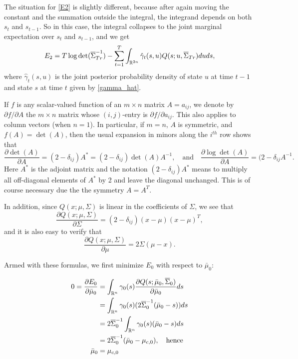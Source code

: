 \documentclass[12pt,leqno]{article}
\begin{document}
The situation for \eqref{E2} is slightly different, because after again moving the constant and the summation outside
the integral, the integrand depends on both $s_t$ and $s_{t-1}$.  So in this case, the integral collapses to the 
joint marginal expectation over $s_t$ and $s_{t-1}$, and we get
$$
E_2 = T\log\det(\overline{\Sigma}^{-1}_{Tr}) - \sum_{t=1}^T\int_{{\mathbb R}^{2n}}\hat{\gamma}_t(s,u)Q(s;u,\overline{\Sigma}_{Tr})duds,
$$
where $\hat{\gamma}_t(s,u)$ is the joint posterior probability density of state $u$ at time $t-1$ and state $s$ 
at time $t$ given by \eqref{gamma_hat}.

If $f$ is any scalar-valued function of an $m\times{n}$ matrix $A = a_{ij}$, we denote by $\partial{f}/\partial{A}$ the 
$m\times{n}$ matrix whose $(i,j)$-entry is $\partial{f}/\partial{a_{ij}}$.  This also applies to column vectors (when $n=1$).
In particular, if $m=n$, $A$ is symmetric, and $f(A) = \det(A)$,  then the usual expansion 
in minors along the $i^{th}$ row shows that 
$$
\frac{\partial{\det(A)}}{\partial{A}} = (2-\delta_{ij})A^* = (2-\delta_{ij})\det(A)A^{-1},\quad\text{and}
\quad\frac{\partial{\log\det(A)}}{\partial{A}} = (2-\delta_{ij}A^{-1}. 
$$
Here $A^*$ is the adjoint matrix and the notation $(2-\delta_{ij})A^*$ means to multiply all off-diagonal elements of $A^*$ by 2
and leave the diagonal unchanged.  This is of course necessary due the the symmetry $A = A^T$.

In addition, since $Q(x;\mu,\Sigma)$ is linear in the coefficients of $\Sigma$, we see that
$$
\frac{\partial{Q(x;\mu,\Sigma)}}{\partial{\Sigma}} = (2-\delta_{ij})(x-\mu)(x-\mu)^T,
$$
and it is also easy to verify that
$$
\frac{\partial{Q(x;\mu,\Sigma)}}{\partial{\mu}} = 2\Sigma(\mu-x).
$$

Armed with these formulas, we first minimize $E_0$ with respect to $\bar{\mu}_0$: 
 
\begin{align}
0 = \frac{\partial{E_0}}{\partial{\bar{\mu}_0}} &= \int_{{\mathbb R}^n}\gamma_0(s)\frac{\partial{Q(s;\bar{\mu}_0,\overline{\Sigma}_0)}}{\partial{\bar{\mu}_0}}ds \notag\\
&= \int_{{\mathbb R}^n}\gamma_0(s)(2\overline{\Sigma}_0^{-1}(\bar{\mu}_0-s))ds\notag\\
&= 2\overline{\Sigma}_0^{-1}\int_{{\mathbb R}^n}\gamma_0(s)(\bar{\mu}_0-s)ds \notag\\
&= 2\overline{\Sigma}_0^{-1}(\bar{\mu}_0-\mu_{c,0}), \quad\text{hence}\notag\\
\bar{\mu}_0 &= \mu_{c,0}\label{mu_0}
\end{align}
\end{document}
